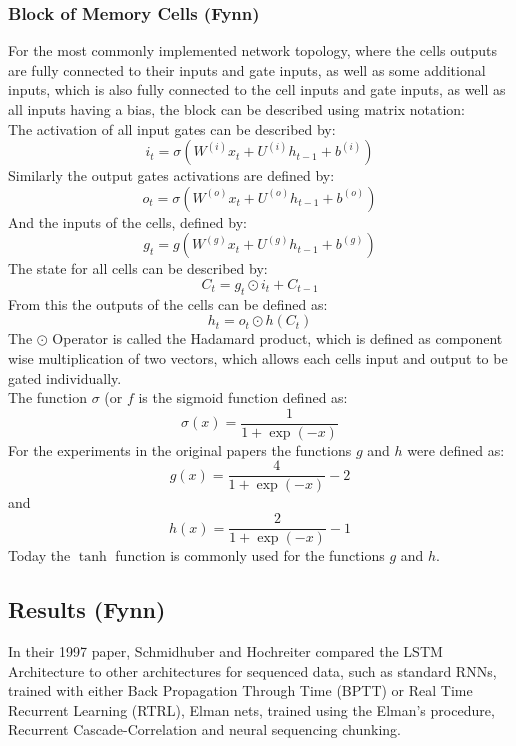 \documentclass[twoside,a4paper,10pt,DIV=12,BCOR=12mm]{scrartcl}
\begin{document}
\subsubsection{Block of Memory Cells (Fynn)}
For the most commonly implemented network topology, where the cells outputs are fully connected to their inputs and gate inputs, as well as some additional inputs, which is also fully connected to the cell inputs and gate inputs, as well as all inputs having a bias, the block can be described using matrix notation:\cite{smagulova2019notation}
\\
The activation of all input gates can be described by:\cite{smagulova2019notation}
$$i_t=\sigma\left(W^{(i)}x_t+U^{(i)}h_{t-1}+b^{(i)}\right)$$
Similarly the output gates activations are defined by:\cite{smagulova2019notation}
$$o_t=\sigma\left(W^{(o)}x_t+U^{(o)}h_{t-1}+b^{(o)}\right)$$
And the inputs of the cells, defined by:\cite{smagulova2019notation}
$$g_t=g\left(W^{(g)}x_t+U^{(g)}h_{t-1}+b^{(g)}\right)$$
The state for all cells can be described by:\cite{smagulova2019notation, hochreiter1991lstm}
$$C_t=g_t\odot i_t+C_{t-1}$$
From this the outputs of the cells can be defined as:\cite{smagulova2019notation, hochreiter1997lstm}
$$h_t=o_t\odot h(C_t)$$
The $\odot$ Operator is called the Hadamard product, which is defined as component wise multiplication of two vectors, which allows each cells input and output to be gated individually.\cite{gokmen2018hadamard, smagulova2019notation} \\ 

The function $\sigma$ (or $f$  is the sigmoid function defined as: \cite{hochreiter1997lstm} $$\sigma(x)=\frac{1}{1+\exp(-x)}$$
For the experiments in the original papers the functions $g$ and $h$ were defined as:\cite{hochreiter1997lstm}
$$g(x)=\frac{4}{1+\exp(-x)}-2$$
and \cite{hochreiter1997lstm}
$$h(x)=\frac{2}{1+\exp(-x)}-1$$
Today the $\tanh$ function is commonly used for the functions $g$ and $h$.\cite{smagulova2019notation}

\subsection{Results (Fynn)}

In their 1997 paper, Schmidhuber and Hochreiter compared the LSTM Architecture to other architectures for sequenced data, such as standard RNNs, trained with either Back Propagation Through Time (BPTT) or Real Time Recurrent Learning (RTRL), Elman nets, trained using the Elman's procedure, Recurrent Cascade-Correlation and neural sequencing chunking.\cite{hochreiter1997lstm}  \\
\end{document}
